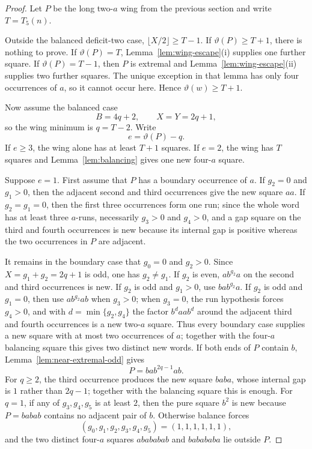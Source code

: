 \documentclass[11pt]{article}
\theoremstyle{definition}
\newcommand{\thetaas}{\vartheta}
\begin{document}
\begin{proof}
Let $P$ be the long two-$a$ wing from the previous section and write $T=T_5(n)$.

Outside the balanced deficit-two case, $\lfloor X/2\rfloor\ge T-1$. If $\thetaas(P)\ge T+1$, there is nothing to prove. If $\thetaas(P)=T$, Lemma~\ref{lem:wing-escape}(i) supplies one further square. If $\thetaas(P)=T-1$, then $P$ is extremal and Lemma~\ref{lem:wing-escape}(ii) supplies two further squares. The unique exception in that lemma has only four occurrences of $a$, so it cannot occur here. Hence $\thetaas(w)\ge T+1$.

Now assume the balanced case
\[
 B=4q+2,\qquad X=Y=2q+1,
\]
so the wing minimum is $q=T-2$. Write
\[
 e=\thetaas(P)-q.
\]
If $e\ge3$, the wing alone has at least $T+1$ squares. If $e=2$, the wing has $T$ squares and Lemma~\ref{lem:balancing} gives one new four-$a$ square.

Suppose $e=1$. First assume that $P$ has a boundary occurrence of $a$. If $g_2=0$ and $g_1>0$, then the adjacent second and third occurrences give the new square $aa$. If $g_2=g_1=0$, then the first three occurrences form one run; since the whole word has at least three $a$-runs, necessarily $g_3>0$ and $g_4>0$, and a gap square on the third and fourth occurrences is new because its internal gap is positive whereas the two occurrences in $P$ are adjacent.

It remains in the boundary case that $g_0=0$ and $g_2>0$. Since $X=g_1+g_2=2q+1$ is odd, one has $g_2\ne g_1$. If $g_2$ is even, $ab^{g_2}a$ on the second and third occurrences is new. If $g_2$ is odd and $g_1>0$, use $bab^{g_2}a$. If $g_2$ is odd and $g_1=0$, then use $ab^{g_2}ab$ when $g_3>0$; when $g_3=0$, the run hypothesis forces $g_4>0$, and with $d=\min\{g_2,g_4\}$ the factor $b^d aa b^d$ around the adjacent third and fourth occurrences is a new two-$a$ square. Thus every boundary case supplies a new square with at most two occurrences of $a$; together with the four-$a$ balancing square this gives two distinct new words. If both ends of $P$ contain $b$, Lemma~\ref{lem:near-extremal-odd} gives
\[
 P=bab^{2q-1}ab.
\]
For $q\ge2$, the third occurrence produces the new square $baba$, whose internal gap is $1$ rather than $2q-1$; together with the balancing square this is enough. For $q=1$, if any of $g_3,g_4,g_5$ is at least $2$, then the pure square $b^2$ is new because $P=babab$ contains no adjacent pair of $b$. Otherwise balance forces
\[
 (g_0,g_1,g_2,g_3,g_4,g_5)=(1,1,1,1,1,1),
\]
and the two distinct four-$a$ squares $abababab$ and $babababa$ lie outside $P$.


\end{proof}
\end{document}
